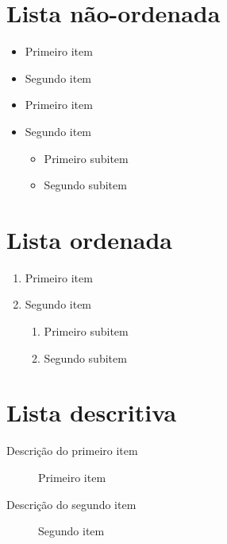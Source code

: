 \documentclass[12pt]{article}
\begin{document}
\section{Lista não-ordenada}

\begin{itemize}
    \item Primeiro item
    \item Segundo item
\end{itemize}

\begin{itemize}
    \item Primeiro item
    \item Segundo item
          \begin{itemize}
              \item Primeiro subitem
              \item Segundo subitem
          \end{itemize}
\end{itemize}

\section{Lista ordenada}

\begin{enumerate}
    \item Primeiro item
    \item Segundo item
          \begin{enumerate}
              \item Primeiro subitem
              \item Segundo subitem
          \end{enumerate}
\end{enumerate}

\section{Lista descritiva}

\begin{description}
    \item[Descrição do primeiro item] Primeiro item
    \item[Descrição do segundo item] Segundo item
\end{description}
\end{document}

